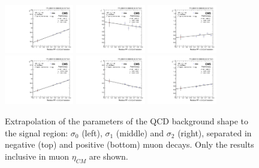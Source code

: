\begin{figure}[!htbp]
 \begin{center}
  \includegraphics[width=0.27\textwidth]{Figures/WBoson/Analysis/SignalExtraction/QCD_Template/EXTRAPOLATION/PA/graph_Sigma0_QCDToMuMi_PA_-29_eta_19_250_pt_1000000.pdf}
  \includegraphics[width=0.27\textwidth]{Figures/WBoson/Analysis/SignalExtraction/QCD_Template/EXTRAPOLATION/PA/graph_Sigma1_QCDToMuMi_PA_-29_eta_19_250_pt_1000000.pdf}
  \includegraphics[width=0.27\textwidth]{Figures/WBoson/Analysis/SignalExtraction/QCD_Template/EXTRAPOLATION/PA/graph_Sigma2_QCDToMuMi_PA_-29_eta_19_250_pt_1000000.pdf}
  \includegraphics[width=0.27\textwidth]{Figures/WBoson/Analysis/SignalExtraction/QCD_Template/EXTRAPOLATION/PA/graph_Sigma0_QCDToMuPl_PA_-29_eta_19_250_pt_1000000.pdf}
  \includegraphics[width=0.27\textwidth]{Figures/WBoson/Analysis/SignalExtraction/QCD_Template/EXTRAPOLATION/PA/graph_Sigma1_QCDToMuPl_PA_-29_eta_19_250_pt_1000000.pdf}
  \includegraphics[width=0.27\textwidth]{Figures/WBoson/Analysis/SignalExtraction/QCD_Template/EXTRAPOLATION/PA/graph_Sigma2_QCDToMuPl_PA_-29_eta_19_250_pt_1000000.pdf}
 \end{center}
 \caption{Extrapolation of the parameters of the QCD background shape to the signal region: $\sigma_{0}$ (left), $\sigma_{1}$ (middle) and $\sigma_{2}$ (right), separated in negative (top) and positive (bottom) muon decays. Only the results inclusive in muon $\eta_{CM}$ are shown.}
 \label{fig:QCD_Extrapolation}
\end{figure}


